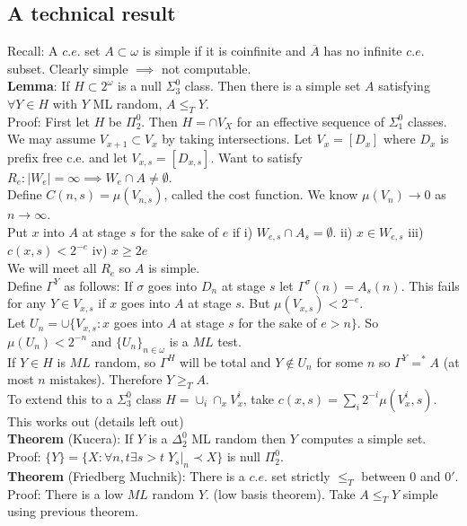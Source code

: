 \documentclass{article}
\begin{document}
      \subsection{A technical result} 
      Recall: A $c.e.$ set $A\subset \omega$ is simple if it is coinfinite and $\overline{A}$ has no infinite $c.e.$ subset. Clearly simple $\implies$ not computable.\\
      \textbf{Lemma}: If $H \subset 2^\omega$ is a null $\Sigma^0_3$ class. Then there is a simple set $A $ satisfying $\forall Y \in H$ with $Y$ ML random, $A \leq_T Y$.
      \\ Proof: First let $H$ be $\Pi^0_2$. Then $H = \cap V_X$ for an effective sequence of $\Sigma^0_1$ classes. We may assume $V_{x+1} \subset V_x$ by taking intersections. Let $V_x = [D_x]$ where $D_x$ is prefix free c.e. and let $V_{x,s} = [D_{x,s}]$. Want to satisfy \\
      $R_e: |W_e| = \infty \implies W_e \cap A \neq \emptyset$. \\
      Define $C(n,s) = \mu(V_{n,s})$, called the cost function. We know $\mu(V_n) \to 0$ as $n \to \infty$.  \\
      Put $x$ into $A$ at stage $s$ for the sake of $e$ if i) $W_{e,s} \cap A_s = \emptyset$. ii) $x \in W_{e,s}$ iii) $c(x,s) < 2^{-e}$ iv) $x \geq 2e$\\
      We will meet all $R_e$ so $A$ is simple.\\
      Define $\Gamma^Y $ as follows: If $\sigma$ goes into $D_n$ at stage $s$ let $\Gamma^\sigma(n) = A_s(n)$. This fails for any $Y \in V_{x,s}$ if $x$ goes into $A$ at stage $s$. But $\mu(V_{x,s}) < 2^{-e}$.\\
      Let $U_n = \cup \{V_{x,s}: x $ goes into $A$ at stage $s$ for the sake of $e>n\}$. So $\mu(U_n) < 2^{-n}$ and $\{U_n\}_{n \in \omega}$ is a $ML$ test.\\
      If $Y \in H$ is $ML$ random, so $\Gamma^H$ will be total and $Y \not \in U_n$ for some $n$ so $\Gamma^Y =^* A $ (at most $n$ mistakes). Therefore $Y \geq_T A$.\\
      To extend this to a $\Sigma^0_3$ class $H = \cup_i \cap_x V_x^i$, take $c(x,s) = \sum_i 2^{-i}\mu(V_x^i,s) $. This works out (details left out)\\
      \textbf{Theorem} (Kucera): If $Y$ is a $\Delta^0_2$ ML random then $Y$ computes a simple set. \\
      Proof: $\{Y\} = \{X : \forall n,t \exists s>t \; Y_s|_n \prec X\}$ is null $\Pi^0_2$.\\
      \textbf{Theorem} (Friedberg Muchnik): There is a $c.e.$ set strictly $\leq_T$ between $0$ and $0'$. \\
      Proof: There is a low $ML$ random $Y$. (low basis theorem). Take $A \leq_TY$ simple using previous theorem.\\
      \newpage
\end{document}
